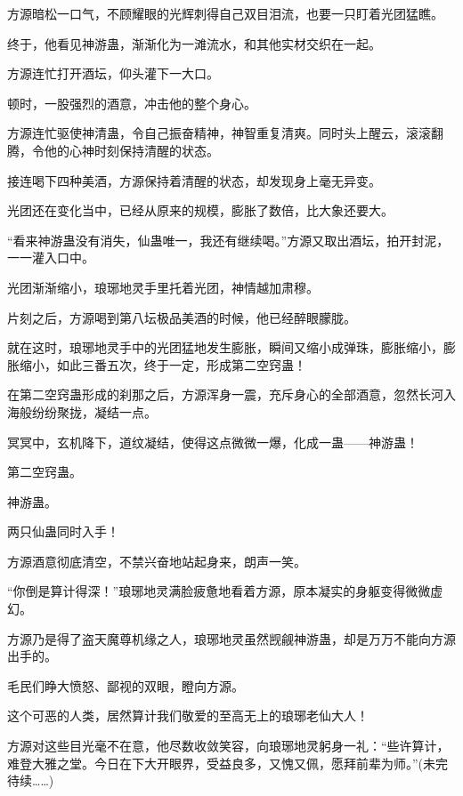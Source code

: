 \begin{this_body}
方源暗松一口气，不顾耀眼的光辉刺得自己双目泪流，也要一只盯着光团猛瞧。

终于，他看见神游蛊，渐渐化为一滩流水，和其他实材交织在一起。

方源连忙打开酒坛，仰头灌下一大口。

顿时，一股强烈的酒意，冲击他的整个身心。

方源连忙驱使神清蛊，令自己振奋精神，神智重复清爽。同时头上醒云，滚滚翻腾，令他的心神时刻保持清醒的状态。

接连喝下四种美酒，方源保持着清醒的状态，却发现身上毫无异变。

光团还在变化当中，已经从原来的规模，膨胀了数倍，比大象还要大。

“看来神游蛊没有消失，仙蛊唯一，我还有继续喝。”方源又取出酒坛，拍开封泥，一一灌入口中。

光团渐渐缩小，琅琊地灵手里托着光团，神情越加肃穆。

片刻之后，方源喝到第八坛极品美酒的时候，他已经醉眼朦胧。

就在这时，琅琊地灵手中的光团猛地发生膨胀，瞬间又缩小成弹珠，膨胀缩小，膨胀缩小，如此三番五次，终于一定，形成第二空窍蛊！

在第二空窍蛊形成的刹那之后，方源浑身一震，充斥身心的全部酒意，忽然长河入海般纷纷聚拢，凝结一点。

冥冥中，玄机降下，道纹凝结，使得这点微微一爆，化成一蛊——神游蛊！

第二空窍蛊。

神游蛊。

两只仙蛊同时入手！

方源酒意彻底清空，不禁兴奋地站起身来，朗声一笑。

“你倒是算计得深！”琅琊地灵满脸疲惫地看着方源，原本凝实的身躯变得微微虚幻。

方源乃是得了盗天魔尊机缘之人，琅琊地灵虽然觊觎神游蛊，却是万万不能向方源出手的。

毛民们睁大愤怒、鄙视的双眼，瞪向方源。

这个可恶的人类，居然算计我们敬爱的至高无上的琅琊老仙大人！

方源对这些目光毫不在意，他尽数收敛笑容，向琅琊地灵躬身一礼：“些许算计，难登大雅之堂。今日在下大开眼界，受益良多，又愧又佩，愿拜前辈为师。”(未完待续……)

\end{this_body}

